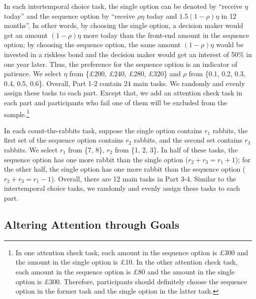 \documentclass[
  12pt,
]{article}
\begin{document}
In each intertemporal choice task, the single option can be denoted by
``receive \(\eta\) today'' and the sequence option by ``receive
\(\rho \eta\) today and \(1.5(1-\rho)\eta\) in 12 months''. In other
words, by choosing the single option, a decision maker would get an
amount \((1-\rho)\eta\) more today than the front-end amount in the
sequence option; by choosing the sequence option, the same amount
\((1-\rho)\eta\) would be invested in a riskless bond and the decision
maker would get an interest of 50\% in one year later. Thus, the
preference for the sequence option is an indicator of patience. We
select \(\eta\) from \{£200, £240, £280, £320\} and \(\rho\) from \{0.1,
0.2, 0.3, 0.4, 0.5, 0.6\}. Overall, Part 1-2 contain 24 main tasks. We
randomly and evenly assign these tasks to each part. Except that, we add
an attention check task in each part and participants who fail one of
them will be excluded from the sample.\footnote{In one attention check
  task, each amount in the sequence option is £300 and the amount in the
  single option is £10. In the other attention check task, each amount
  in the sequence option is £80 and the amount in the single option is
  £300. Therefore, participants should definitely choose the sequence
  option in the former task and the single option in the latter task.}

In each count-the-rabbits task, suppose the single option contains
\(r_1\) rabbits, the first set of the sequence option contains \(r_2\)
rabbits, and the second set contains \(r_3\) rabbits. We select \(r_1\)
from \{7, 8\}, \(r_2\) from \{1, 2, 3\}. In half of these tasks, the
sequence option has one more rabbit than the single option
(\(r_2 + r_3 = r_1 + 1\)); for the other half, the single option has one
more rabbit than the sequence option (\(r_2 + r_3 = r_1 - 1\)). Overall,
there are 12 main tasks in Part 3-4. Similar to the intertemporal choice
tasks, we randomly and evenly assign these tasks to each part.

\hypertarget{altering-attention-through-goals}{%
\subsection{Altering Attention through
Goals}\label{altering-attention-through-goals}}
\end{document}

